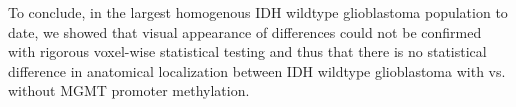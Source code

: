 To conclude, in the largest homogenous \gls{IDH} wildtype glioblastoma population to date, we showed that visual appearance of differences could not be confirmed with rigorous voxel-wise statistical testing and thus that there is no statistical difference in anatomical localization between \gls{IDH} wildtype glioblastoma with vs. without \gls{MGMT} promoter methylation.




